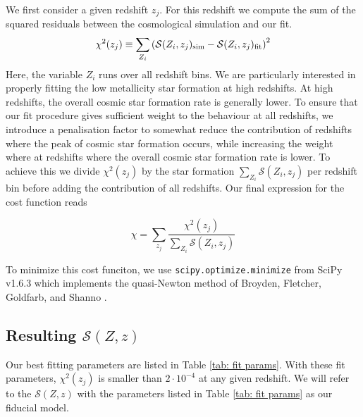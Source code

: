 \documentclass[twocolumn]{aastex631}
\newcommand{\Msun}{\ensuremath{\rm{M}_{\odot}}\xspace}
\newcommand{\yr}{\ensuremath{\,\rm{yr}}\xspace}
\newcommand{\Mpc}{\ensuremath{\,\rm{Gpc}}\xspace}
\newcommand{\SFRDzZ}{\ensuremath{\mathcal{S}(Z,z)}\xspace}
\begin{document}
We first consider a given redshift $z_j$.  For this redshift we compute the sum of the squared residuals between the cosmological simulation and our fit.  
%
\begin{equation}
\label{eq: chisquare}
    \chi^2 (z_j) \equiv \sum_{Z_i} \left( 
        \mathcal{S}(Z_i,z_j)_{\rm sim} - 
        \mathcal{S}(Z_i,z_j)_{\rm fit}\right)^2
\end{equation}
%
Here, the variable $Z_i$ runs over all redshift bins.
We are particularly interested in properly fitting the low metallicity star formation at high redshifts. At high redshifts, the overall cosmic star formation rate is generally lower. To ensure that our fit procedure gives sufficient weight to the behaviour at all redshifts, we introduce a penalisation factor to somewhat reduce the contribution of redshifts where the peak of cosmic star formation occurs, while increasing the weight where at redshifts where the overall cosmic star formation rate is lower.  To achieve this we divide $\chi^2 (z_j)$ by the star formation $\sum_{Z_i} \mathcal{S}(Z_i,z_j)$ per redshift bin before adding the contribution of all redshifts.  Our final expression for the cost function reads

\begin{equation}
\label{eq: cost function}
    \chi  = \sum_{z_j} \frac{ \chi^2 (z_j) } 
        {\sum_{Z_i} \mathcal{S}(Z_i,z_j)}
\end{equation}

To minimize this cost funciton, we use \texttt{scipy.optimize.minimize} from SciPy v1.6.3 which implements the quasi-Newton method of Broyden, Fletcher, Goldfarb, and Shanno \citep[BFGS,][]{NocedalWright_numerical_optimization}. 

\subsection{Resulting \SFRDzZ}
Our best fitting parameters are listed in Table \ref{tab: fit params}. With these fit parameters, $\chi^2(z_j)$ is smaller than $2\cdot 10^{-4}$ at any given redshift. We will refer to the \SFRDzZ with the parameters listed in Table \ref{tab: fit params} as our fiducial model. 
\end{document}

